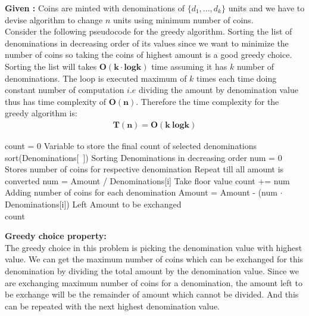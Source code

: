 \documentclass[a4paper,11pt]{article}
\theoremstyle{quest}
\newenvironment{solution}[2][Solution]{\begin{trivlist}
		\item[\hskip \labelsep {\bfseries #1}\hskip \labelsep {\bfseries #2.}]}{\end{trivlist}}
\begin{document}
\begin{solution}2 \textbf{Given :} Coins are minted with denominations of $\{d_1, . . . , d_k\}$ units and we have to devise algorithm to change $n$ units using minimum number of coins.\\

		
Consider the following pseudocode for the greedy algorithm. Sorting the list of denominations in decreasing order of its values since we want to minimize the number of coins so taking the coins of highest amount is a good greedy choice. Sorting the list will takes $\mathbf{O(k\cdot logk)}$ time assuming it has $k$ number of denominations. The loop is executed maximum of $k$ times each time doing constant number of computation $i.e$ dividing the amount by denomination value thus has time complexity of $\mathbf{O(n)}$. Therefore the time complexity for the greedy algorithm is:
\begin{align}
\boxed{\mathbf{T(n) = O(k~logk)}}
\end{align} 
\begin{algorithm}
	\caption{}
	\label{Algorithm}
	\begin{algorithmic}
		\State count = 0
		\Comment Variable to store the final count of selected denominations
		\State sort(Denominations[~])
		\Comment Sorting Denominations in decreasing order
		\State num = 0
		\Comment Stores number of coins for respective denomination
		\Comment Repeat till all amount is converted
		\State num = Amount / Denominations[i]
		\Comment Take floor value
		\State count += num
		\Comment Adding number of coins for each denomination
		\State Amount = Amount - (num $\cdot$ Denominations[i])
		\Comment Left Amount to be exchanged
		\EndIf
		\EndWhile\\
		\Return count
		\EndFunction	
		\end{algorithmic} 	
		\end{algorithm}

		\textbf{Greedy choice property:}\\
		The greedy choice in this problem is picking the denomination value with highest value. We can get the maximum number of coins which can be exchanged for this denomination by dividing the total amount by the denomination value. Since we are exchanging maximum number of coins for a denomination, the amount left to be exchange will be the remainder of amount which cannot be divided. And this can be repeated with the next highest denomination value.
		

\end{solution}
\end{document}
